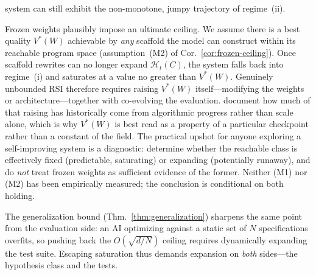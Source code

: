 system can still exhibit the non-monotone, jumpy trajectory of regime~(ii).

Frozen weights plausibly impose an ultimate ceiling. We assume there is a best quality $V^*(W)$ achievable by \emph{any} scaffold the model can construct within its reachable program space (assumption~(M2) of Cor.~\ref{cor:frozen-ceiling}). Once scaffold rewrites can no longer expand $\mathcal{H}_t(C)$, the system falls back into regime~(i) and saturates at a value no greater than $V^*(W)$. Genuinely unbounded RSI therefore requires raising $V^*(W)$ itself---modifying the weights or architecture---together with co-evolving the evaluation. \citet{hernandez2019measuring} document how much of that raising has historically come from algorithmic progress rather than scale alone, which is why $V^*(W)$ is best read as a property of a particular checkpoint rather than a constant of the field. The practical upshot for anyone exploring a self-improving system is a diagnostic: determine whether the reachable class is effectively fixed (predictable, saturating) or expanding (potentially runaway), and do \emph{not} treat frozen weights as sufficient evidence of the former. Neither (M1) nor (M2) has been empirically measured; the conclusion is conditional on both holding.

The generalization bound (Thm.~\ref{thm:generalization}) sharpens the same point from the evaluation side: an AI optimizing against a static set of $N$ specifications overfits, so pushing back the $O(\sqrt{d/N})$ ceiling requires dynamically expanding the test suite. Escaping saturation thus demands expansion on \emph{both} sides---the hypothesis class and the tests.

